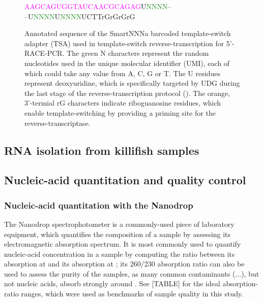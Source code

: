 \begin{figure}
\begin{center}
\LARGE
\textcolor{Fuchsia}{AAGCAGUGGTAUCAACGCAGAG}U\textcolor{ForestGreen}{NNNN}--\\--U\textcolor{ForestGreen}{NNNN}U\textcolor{ForestGreen}{NNNN}UCTT\textcolor{BurntOrange}{rGrGrGrG}
\end{center}
\caption{Annotated sequence of the SmartNNNa barcoded template-switch adapter (TSA) used in template-switch reverse-transcription for 5'-RACE-PCR. The green N characters represent the random nucleotides used in the unique molecular identifier (UMI), each of which could take any value from A, C, G or T. The U residues represent deoxyuridine, which is specifically targeted by UDG during the last stage of the reverse-transcription protocol (). The orange, 3'-termial rG characters indicate riboguanosine residues, which enable template-switching by providing a priming site for the reverse-transcriptase.} %
\label{fig:tsa}
\end{figure}


\subsection{RNA isolation from killifish samples}

\subsection{Nucleic-acid quantitation and quality control}

\subsubsection{Nucleic-acid quantitation with the Nanodrop} %

The Nanodrop spectrophotometer is a commonly-used piece of laboratory equipment, which quantifies the composition of a sample by assessing its electromagnetic absorption spectrum. It is most commonly used to quantify nucleic-acid concentration in a sample by computing the ratio between its absorption at  and its absorption at ; its 260/230 absorption ratio can also be used to assess the purity of the samples, as many common contaminants (...), but not nucleic acids, absorb strongly around . See [TABLE] for the ideal absorption-ratio ranges, which were used as benchmarks of sample quality in this study. %


